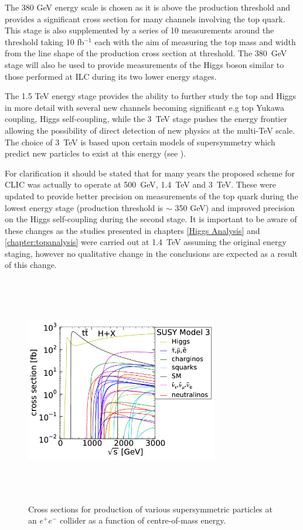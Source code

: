 The 380 GeV energy scale is chosen as it is above the \ttbar production threshold and provides a significant cross section for many channels involving the top quark. This stage is also supplemented by a series of 10 measurements around the \ttbar threshold taking 10 fb${^{-1}}$ each with the aim of measuring the top mass and width from the line shape of the \ttbar production cross section at threshold. The 380~GeV stage will also be used to provide measurements of the Higgs boson similar to those performed at \ac{ILC} during its two lower energy stages.

The 1.5 TeV energy stage provides the ability to further study the top and Higgs in more detail with several new channels becoming significant e.g top Yukawa coupling, Higgs self-coupling, while the 3~TeV stage pushes the energy frontier allowing the possibility of direct detection of new physics at the multi-TeV scale. The choice of 3~TeV is based upon certain models of supersymmetry which predict new particles to exist at this energy (see ).

For clarification it should be stated that for many years the proposed scheme for CLIC was actually to operate at 500~GeV, 1.4~TeV and 3~TeV. These were updated to provide better precision on measurements of the top quark during the lowest energy stage (\ttbar production threshold is $\sim$ 350 GeV) and improved precision on the Higgs self-coupling during the second stage. It is important to be aware of these changes as the studies presented in chapters \ref{Higgs Analysis} and \ref{chapter:topanalysis} were carried out at 1.4~TeV assuming the original energy staging, however no qualitative change in the conclusions are expected as a result of this change.  

\begin{figure}
  \centering
  \includegraphics[width=0.75\textwidth,height=10cm,keepaspectratio]{Experiments/fig/clicSS}
  \caption[Cross Sections For Supersymmetric Processes at \ac{CLIC}]{Cross sections for production of various supersymmetric particles at an ${e^+e^-}$ collider as a function of centre-of-mass energy\cite{CDR}.}
  \label{Fig:SuperSym}
\end{figure}

